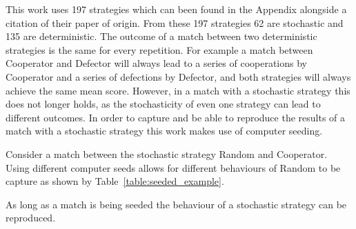 \documentclass{article}
\begin{document}
This work uses 197 strategies which can been found in the Appendix alongside a
citation of their paper of origin. From these 197 strategies 62 are stochastic
and 135 are deterministic. The outcome of a match between two deterministic
strategies is the same for every repetition. For example a match between
Cooperator and Defector will always lead to a series of cooperations by
Cooperator and a series of defections by Defector, and both strategies will
always achieve the same mean score. However, in a match with a stochastic
strategy this does not longer holds, as the stochasticity of even one strategy
can lead to different outcomes. In order to capture and be able to reproduce the
results of a match with a stochastic strategy this work makes use of computer
seeding.

Consider a match between the stochastic strategy Random and Cooperator.
Using different computer seeds allows for different behaviours of Random to
be capture as shown by Table~\ref{table:seeded_example}.

As long as a match is being seeded the behaviour of a stochastic strategy can be
reproduced.
\end{document}
